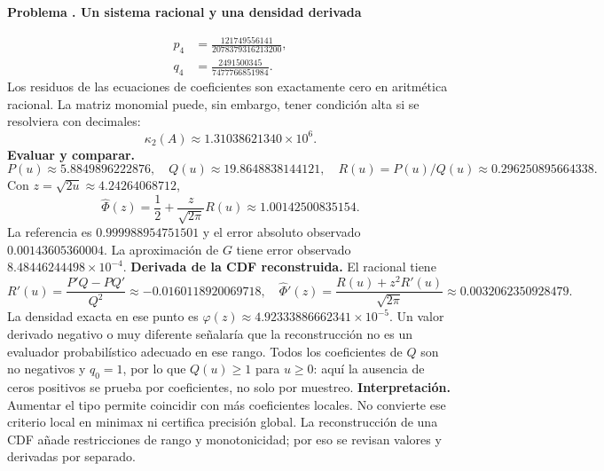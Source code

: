 \documentclass[11pt,a4paper]{article}
\theoremstyle{definition}
\newcounter{problema}
\newenvironment{resuelto}[1]{\refstepcounter{problema}\par\medskip\Needspace{6\baselineskip}\textbf{Problema \theproblema. #1}\par}{\par\medskip}
\begin{document}
\begin{resuelto}{Un sistema racional y una densidad derivada}
\[\]
\[
\begin{aligned}p_4&=\frac{121749556141}{2078379316213200},\\q_4&=\frac{2491500345}{7477766851984}.\end{aligned}
\]
Los residuos de las ecuaciones de coeficientes son exactamente cero en aritmética racional. La matriz monomial puede, sin embargo, tener condición alta si se resolviera con decimales:
\[
\kappa_2(A)\approx1.31038621340\times10^{6}.
\]
\textbf{Evaluar y comparar.}
\[
P(u)\approx5.8849896222876,\quad Q(u)\approx19.8648838144121,\quad R(u)=P(u)/Q(u)\approx0.296250895664338.
\]
Con $z=\sqrt{2u}\approx4.24264068712$,
\[
\widehat\Phi(z)=\frac12+\frac z{\sqrt{2\pi}}R(u)\approx1.00142500835154.
\]
La referencia es $0.999988954751501$ y el error absoluto observado $0.00143605360004$. La aproximación de $G$ tiene error observado $8.48446244498\times10^{-4}$.
\textbf{Derivada de la CDF reconstruida.} El racional tiene
\[
R\prime(u)=\frac{P\prime Q-PQ\prime}{Q^2}\approx-0.0160118920069718,\quad
\widehat\Phi\prime(z)=\frac{R(u)+z^2R\prime(u)}{\sqrt{2\pi}}\approx0.0032062350928479.
\]
La densidad exacta en ese punto es $\varphi(z)\approx4.92333886662341\times10^{-5}$. Un valor derivado negativo o muy diferente señalaría que la reconstrucción no es un evaluador probabilístico adecuado en ese rango.
Todos los coeficientes de $Q$ son no negativos y $q_0=1$, por lo que $Q(u)\ge1$ para $u\ge0$: aquí la ausencia de ceros positivos se prueba por coeficientes, no solo por muestreo.
\textbf{Interpretación.} Aumentar el tipo permite coincidir con más coeficientes locales. No convierte ese criterio local en minimax ni certifica precisión global. La reconstrucción de una CDF añade restricciones de rango y monotonicidad; por eso se revisan valores y derivadas por separado.
\end{resuelto}
\end{document}
